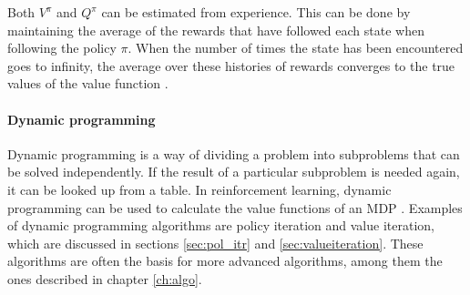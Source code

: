 Both $V^\pi$ and $Q^\pi$ can be estimated from experience. This can be done by
maintaining the average of the rewards that have followed each state when
following the policy $\pi$. When the number of times the state has been
encountered goes to infinity, the average over these histories of rewards
converges to the true values of the value function
\parencite{barto1998reinforcement}.

\paragraph{Dynamic programming}

Dynamic programming is a way of dividing a problem into subproblems that can be
solved independently. If the result of a particular subproblem is needed again,
it can be looked up from a table. In reinforcement learning, dynamic
programming can be used to calculate the value functions of an MDP
\parencite{bellman1957mdp}. Examples of dynamic programming algorithms are
policy iteration and value iteration, which are discussed in sections
\ref{sec:pol_itr} and \ref{sec:valueiteration}. These algorithms are often the
basis for more advanced algorithms, among them the ones described in chapter
\ref{ch:algo}. 



